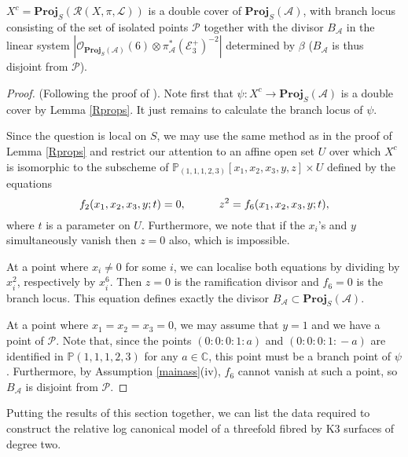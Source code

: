 \documentclass{amsart}
\begin{document}
\begin{prop} \label{branchdiv} $X^c = \mathbf{Proj}_S({\mathcal{R}}(X,\pi,{\mathcal{L}}))$ is a double cover of $\mathbf{Proj}_S({\mathcal{A}})$, with branch locus consisting of the set of isolated points ${\mathcal{P}}$ together with the divisor $B_{\mathcal{A}}$ in the linear system $|{\mathcal{O}}_{\mathbf{Proj}_S({\mathcal{A}})}(6) \otimes \pi_{\mathcal{A}}^*({\mathcal{E}}_3^+)^{-2}|$ determined by $\beta$ ($B_{\mathcal{A}}$ is thus disjoint from ${\mathcal{P}}$).
\end{prop}
\begin{proof} (Following the proof of \cite[Theorem 4.7]{flgi}). Note first that $\psi\colon X^c \to \mathbf{Proj}_S({\mathcal{A}})$ is a double cover by Lemma \ref{Rprops}. It just remains to calculate the branch locus of $\psi$.

Since the question is local on $S$, we may use the same method as in the proof of Lemma \ref{Rprops} and restrict our attention to an affine open set $U$ over which $X^c$ is isomorphic to the subscheme of ${\mathbb{P}}_{(1,1,1,2,3)}[x_1,x_2,x_3,y,z] \times U$ defined by the equations
\[ f_2(x_1,x_2,x_3,y;t) = 0, \makebox[3em]{} z^2 = f_6(x_1,x_2,x_3,y;t),\]
where $t$ is a parameter on $U$. Furthermore, we note that if the $x_i$'s and $y$ simultaneously vanish then $z=0$ also, which is impossible.

At a point where $x_i \neq 0$ for some $i$, we can localise both equations by dividing by $x_i^2$, respectively by $x_i^6$. Then $z = 0$ is the ramification divisor and $f_6 = 0$ is the branch locus. This equation defines exactly the divisor $B_{\mathcal{A}} \subset \mathbf{Proj}_S({\mathcal{A}})$.

At a point where $x_1 = x_2 = x_3 = 0$, we may assume that $y =1$ and we have a point of ${\mathcal{P}}$. Note that, since the points $(0\!:\!0\!:\!0\!:\!1\!:\!a)$ and $(0\!:\!0\!:\!0\!:\!1\!:\!-a)$ are identified in ${\mathbb{P}}(1,1,1,2,3)$ for any $a \in {\mathbb{C}}$, this point must be a branch point of $\psi$. Furthermore, by Assumption \ref{mainass}(iv), $f_6$ cannot vanish at such a point, so $B_{\mathcal{A}}$ is disjoint from ${\mathcal{P}}$. \end{proof}

Putting the results of this section together, we can list the data required to construct the relative log canonical model of a threefold fibred by K3 surfaces of degree two. 
\end{document}

